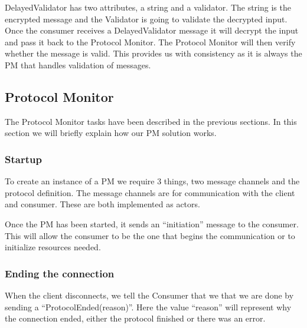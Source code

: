 DelayedValidator has two attributes, a string and a validator. The string is the encrypted message and the Validator is going to validate the decrypted input. Once the consumer receives a DelayedValidator message it will decrypt the input and pass it back to the Protocol Monitor. The Protocol Monitor will then verify whether the message is valid. This provides us with consistency as it is always the PM that handles validation of messages.
   
%


\subsection{Protocol Monitor}
The Protocol Monitor tasks have been described in the previous sections. In this section we will briefly explain how our PM solution works.
\subsubsection{Startup}
To create an instance of a PM we require 3 things, two message channels and the protocol definition. The message channels are for communication with the client and consumer. These are both implemented as actors. 

Once the PM has been started, it sends an ``initiation'' message to the consumer. This will allow the consumer to be the one that begins the communication or to initialize resources needed.

\subsubsection{Ending the connection}
When the client disconnects, we tell the Consumer that we that we are done by sending a ``ProtocolEnded(reason)''. Here the value ``reason'' will represent why the connection ended, either the protocol finished or there was an error.

%




